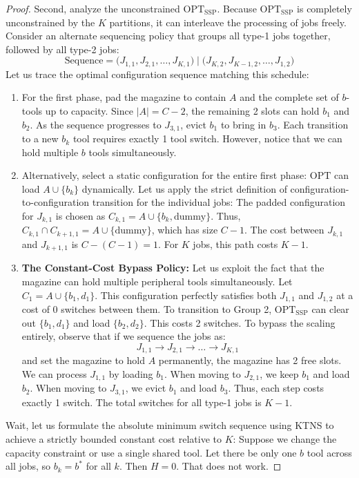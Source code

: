 \documentclass[11pt,a4paper]{article}
\theoremstyle{plain}
\theoremstyle{definition}
\newcommand{\OPT}{\text{OPT}}
\newcommand{\SSP}{\text{SSP}}
\begin{document}
\begin{proof}
	Second, analyze the unconstrained $\OPT_{\SSP}$. Because $\OPT_{\SSP}$ is completely unconstrained by the $K$ partitions, it can interleave the processing of jobs freely. Consider an alternate sequencing policy that groups all type-1 jobs together, followed by all type-2 jobs:
	\[ \text{Sequence} = \Big( J_{1,1}, J_{2,1}, \dots, J_{K,1} \Big) \;\Big|\; \Big( J_{K,2}, J_{K-1,2}, \dots, J_{1,2} \Big) \]
	Let us trace the optimal configuration sequence matching this schedule:
	\begin{enumerate}[label=\roman*)]
		\item For the first phase, pad the magazine to contain $A$ and the complete set of $b$-tools up to capacity. Since $|A| = C-2$, the remaining 2 slots can hold $b_1$ and $b_2$. As the sequence progresses to $J_{3,1}$, evict $b_1$ to bring in $b_3$. Each transition to a new $b_k$ tool requires exactly 1 tool switch. However, notice that we can hold multiple $b$ tools simultaneously. 
		\item Alternatively, select a static configuration for the entire first phase: $\OPT$ can load $A \cup \{b_k\}$ dynamically. Let us apply the strict definition of configuration-to-configuration transition for the individual jobs:
		The padded configuration for $J_{k,1}$ is chosen as $C_{k,1} = A \cup \{b_k, \text{dummy}\}$. Thus, $C_{k,1} \cap C_{k+1,1} = A \cup \{\text{dummy}\}$, which has size $C-1$. 
		The cost between $J_{k,1}$ and $J_{k+1,1}$ is $C - (C-1) = 1$. For $K$ jobs, this path costs $K-1$.
		\item \textbf{The Constant-Cost Bypass Policy:} Let us exploit the fact that the magazine can hold multiple peripheral tools simultaneously. Let $C_1 = A \cup \{b_1, d_1\}$. This configuration perfectly satisfies both $J_{1,1}$ and $J_{1,2}$ at a cost of 0 switches between them. 
		To transition to Group 2, $\OPT_{\SSP}$ can clear out $\{b_1, d_1\}$ and load $\{b_2, d_2\}$. This costs 2 switches. 
		To bypass the scaling entirely, observe that if we sequence the jobs as:
		\[ J_{1,1} \to J_{2,1} \to \dots \to J_{K,1} \]
		and set the magazine to hold $A$ permanently, the magazine has 2 free slots. We can process $J_{1,1}$ by loading $b_1$. When moving to $J_{2,1}$, we keep $b_1$ and load $b_2$. When moving to $J_{3,1}$, we evict $b_1$ and load $b_3$. Thus, each step costs exactly 1 switch.
		The total switches for all type-1 jobs is $K-1$.
	\end{enumerate}
	Wait, let us formulate the absolute minimum switch sequence using KTNS to achieve a strictly bounded constant cost relative to $K$:
	Suppose we change the capacity constraint or use a single shared tool. Let there be only one $b$ tool across all jobs, so $b_k = b^*$ for all $k$. Then $H=0$. That does not work.
	

\end{proof}
\end{document}
